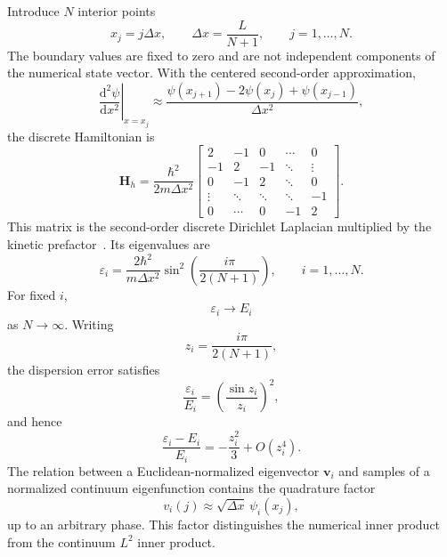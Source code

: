 Introduce $N$ interior points
\begin{equation}
    x_j=j\Delta x,
    \qquad
    \Delta x=\frac{L}{N+1},
    \qquad
    j=1,\ldots,N.
\end{equation}
The boundary values are fixed to zero and are not independent components of
the numerical state vector. With the centered second-order approximation,
\begin{equation}
    \left.
        \frac{\mathrm{d}^2\psi}{\mathrm{d}x^2}
    \right|_{x=x_j}
    \approx
    \frac{
        \psi(x_{j+1})-2\psi(x_j)+\psi(x_{j-1})
    }{\Delta x^2},
\end{equation}
the discrete Hamiltonian is
\begin{equation}
    \mathbf H_h
    =
    \frac{\hbar^2}{2m\Delta x^2}
    \begin{bmatrix}
        2 & -1 & 0 & \cdots & 0 \\
        -1 & 2 & -1 & \ddots & \vdots \\
        0 & -1 & 2 & \ddots & 0 \\
        \vdots & \ddots & \ddots & \ddots & -1 \\
        0 & \cdots & 0 & -1 & 2
    \end{bmatrix}.
\end{equation}
This matrix is the second-order discrete Dirichlet Laplacian multiplied by the
kinetic prefactor~\cite{strikwerda2004}. Its eigenvalues are
\begin{equation}
    \varepsilon_i
    =
    \frac{2\hbar^2}{m\Delta x^2}
    \sin^2\left(
        \frac{i\pi}{2(N+1)}
    \right),
    \qquad
    i=1,\ldots,N.
\end{equation}
For fixed $i$,
\begin{equation}
    \varepsilon_i\longrightarrow E_i
\end{equation}
as $N\rightarrow\infty$. Writing
\begin{equation}
    z_i=\frac{i\pi}{2(N+1)},
\end{equation}
the dispersion error satisfies
\begin{equation}
    \frac{\varepsilon_i}{E_i}
    =
    \left(\frac{\sin z_i}{z_i}\right)^2,
\end{equation}
and hence
\begin{equation}
    \frac{\varepsilon_i-E_i}{E_i}
    =
    -\frac{z_i^2}{3}+O(z_i^4).
\end{equation}
The relation between a Euclidean-normalized eigenvector $\mathbf v_i$ and
samples of a normalized continuum eigenfunction contains the quadrature factor
\begin{equation}
    v_i(j)
    \approx
    \sqrt{\Delta x}\,\psi_i(x_j),
\end{equation}
up to an arbitrary phase. This factor distinguishes the numerical inner
product from the continuum $L^2$ inner product.

